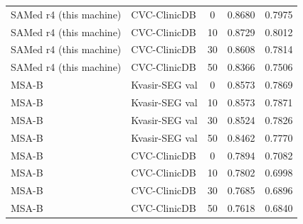 \begin{table}[ht]
\begin{tabular}{llccc}
SAMed r4 (this machine) & CVC-ClinicDB & 0 & 0.8680 & 0.7975 \\
SAMed r4 (this machine) & CVC-ClinicDB & 10 & 0.8729 & 0.8012 \\
SAMed r4 (this machine) & CVC-ClinicDB & 30 & 0.8608 & 0.7814 \\
SAMed r4 (this machine) & CVC-ClinicDB & 50 & 0.8366 & 0.7506 \\
MSA-B & Kvasir-SEG val & 0 & 0.8573 & 0.7869 \\
MSA-B & Kvasir-SEG val & 10 & 0.8573 & 0.7871 \\
MSA-B & Kvasir-SEG val & 30 & 0.8524 & 0.7826 \\
MSA-B & Kvasir-SEG val & 50 & 0.8462 & 0.7770 \\
MSA-B & CVC-ClinicDB & 0 & 0.7894 & 0.7082 \\
MSA-B & CVC-ClinicDB & 10 & 0.7802 & 0.6998 \\
MSA-B & CVC-ClinicDB & 30 & 0.7685 & 0.6896 \\
MSA-B & CVC-ClinicDB & 50 & 0.7618 & 0.6840 \\
\bottomrule
\end{tabular}
\end{table}
